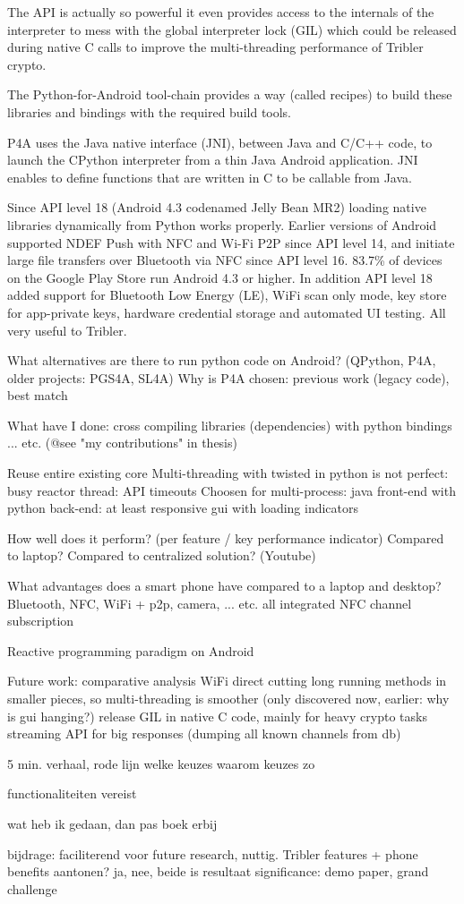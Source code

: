 The API is actually so powerful it even provides access to the internals of the interpreter to mess with the global interpreter lock (GIL) which could be released during native C calls to improve the multi-threading performance of Tribler crypto.

The Python-for-Android tool-chain provides a way (called recipes) to build these libraries and bindings with the required build tools.

P4A uses the Java native interface (JNI), between Java and C/C++ code, to launch the CPython interpreter from a thin Java Android application.
JNI enables to define functions that are written in C to be callable from Java.


Since API level 18 (Android 4.3 codenamed Jelly Bean MR2) loading native libraries dynamically from Python works properly.
Earlier versions of Android supported NDEF Push with NFC and Wi-Fi P2P since API level 14, and initiate large file transfers over Bluetooth via NFC since API level 16.
83.7\% of devices on the Google Play Store run Android 4.3 or higher.
In addition API level 18 added support for Bluetooth Low Energy (LE), WiFi scan only mode, key store for app-private keys, hardware credential storage and automated UI testing.
All very useful to Tribler.


What alternatives are there to run python code on Android? (QPython, P4A, older projects: PGS4A, SL4A)
Why is P4A chosen: previous work (legacy code), best match

What have I done: cross compiling libraries (dependencies) with python bindings
... etc. (@see "my contributions" in thesis)


Reuse entire existing core
Multi-threading with twisted in python is not perfect: busy reactor thread: API timeouts
Choosen for multi-process: java front-end with python back-end: at least responsive gui with loading indicators



How well does it perform? (per feature / key performance indicator)
Compared to laptop?
Compared to centralized solution? (Youtube)

What advantages does a smart phone have compared to a laptop and desktop?
Bluetooth, NFC, WiFi + p2p, camera, ... etc. all integrated
NFC channel subscription

Reactive programming paradigm on Android

Future work:
comparative analysis
WiFi direct
cutting long running methods in smaller pieces, so multi-threading is smoother (only discovered now, earlier: why is gui hanging?)
release GIL in native C code, mainly for heavy crypto tasks
streaming API for big responses (dumping all known channels from db)



5 min. verhaal, rode lijn
welke keuzes
waarom keuzes zo

functionaliteiten vereist


wat heb ik gedaan, dan pas boek erbij


bijdrage: faciliterend voor future research, nuttig. Tribler features + phone benefits
aantonen? ja, nee, beide is resultaat
significance: demo paper, grand challenge

